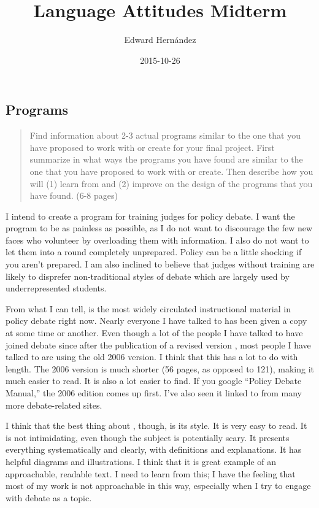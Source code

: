 \documentclass[man,12pt]{apa6}
\begin{document}
\title{Language Attitudes Midterm}
\author{Edward Hern\'{a}ndez}
\date{2015-10-26}
\maketitle

\subsection{Programs}
\begin{quote}
	Find information about 2-3 actual programs similar to the one that you have
	proposed to work with or create for your final project. First summarize in
	what ways the programs you have found are similar to the one that you have
	proposed to work with or create. Then describe how you will (1) learn from
	and (2) improve on the design of the programs that you have found. 
	(6-8 pages)
\end{quote}

I intend to create a program for training judges for policy debate.
I want the program to be as painless as possible, as I do not want to
discourage the few new faces who volunteer by overloading them with
information.
I also do not want to let them into a round completely unprepared. Policy can
be a little shocking if you aren't prepared. I am also inclined to believe that
judges without training are likely to disprefer non-traditional styles of
debate which are largely used by underrepresented students.

From what I can tell, \citet{Bellon06} is the most widely circulated
instructional material in policy debate right now. Nearly everyone I have
talked to has been given a copy at some time or another. Even though a lot of
the people I have talked to have joined debate since after the publication of a
revised version \cite{Bellon08}, most people I have talked to are using the old
2006 version. I think that this has a lot to do with length. The 2006 version
is much shorter (56 pages, as opposed to 121), making it much easier to read.
It is also a lot easier to find. If you google ``Policy Debate Manual,'' the
2006 edition comes up first. I've also seen it linked to from many more
debate-related sites.

I think that the best thing about \citet{Bellon06}, though, is its style. It is
very easy to read. It is not intimidating, even though the subject is
potentially scary. It presents everything systematically and clearly, with
definitions and explanations. It has helpful diagrams and illustrations. I
think that it is great example of an approachable, readable text. I need to
learn from this; I have the feeling that most of my work is not approachable in
this way, especially when I try to engage with debate as a topic.
\end{document}
